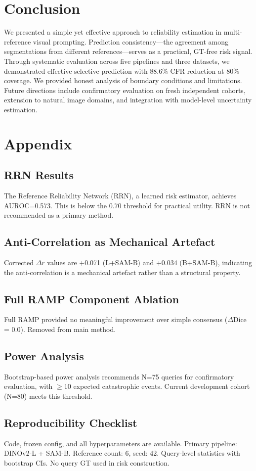 \documentclass[11pt]{article}
\begin{document}
\section{Conclusion}

We presented a simple yet effective approach to reliability estimation in multi-reference 
visual prompting. Prediction consistency---the agreement among segmentations from different 
references---serves as a practical, GT-free risk signal. Through systematic evaluation across 
five pipelines and three datasets, we demonstrated effective selective prediction with 88.6\% 
CFR reduction at 80\% coverage. We provided honest analysis of boundary conditions and 
limitations. Future directions include confirmatory evaluation on fresh independent cohorts, 
extension to natural image domains, and integration with model-level uncertainty estimation.

\appendix
\section{Appendix}

\subsection{RRN Results}
The Reference Reliability Network (RRN), a learned risk estimator, achieves AUROC=0.573. 
This is below the 0.70 threshold for practical utility. RRN is not recommended as a primary method.

\subsection{Anti-Correlation as Mechanical Artefact}
Corrected $\Delta r$ values are +0.071 (L+SAM-B) and +0.034 (B+SAM-B), indicating the 
anti-correlation is a mechanical artefact rather than a structural property.

\subsection{Full RAMP Component Ablation}
Full RAMP provided no meaningful improvement over simple consensus ($\Delta$Dice = 0.0). 
Removed from main method.

\subsection{Power Analysis}
Bootstrap-based power analysis recommends N=75 queries for confirmatory evaluation, 
with $\ge$10 expected catastrophic events. Current development cohort (N=80) meets this threshold.

\subsection{Reproducibility Checklist}
Code, frozen config, and all hyperparameters are available. Primary pipeline: DINOv2-L + SAM-B. 
Reference count: 6, seed: 42. Query-level statistics with bootstrap CIs. No query GT used in 
risk construction.
\end{document}
